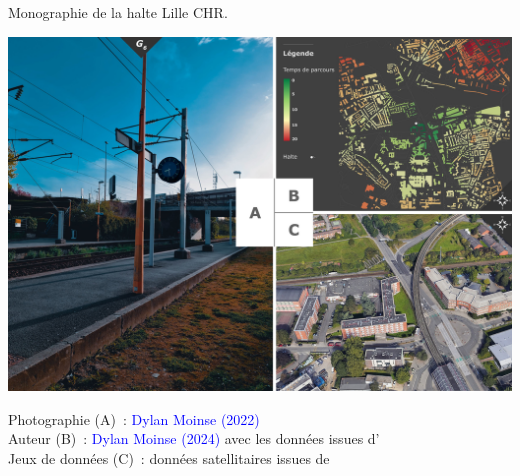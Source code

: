 \begin{refsegment}
        \begin{carte}[h!]\vspace*{4pt}
        \caption{Monographie de la halte Lille CHR.}
        \label{fig-chap3:monographie-lille-chr}
        \centerline{\includegraphics[height=.35\pageheight]{src/Figures/Chap-3/FR_Gare_Lille_CHR.jpg}}
        \vspace{5pt}
        \begin{flushright}\scriptsize{
        Photographie (A)~: \textcolor{blue}{Dylan Moinse (2022)}
        \\
        Auteur (B)~: \textcolor{blue}{Dylan Moinse (2024)} avec les données issues d'\textcolor{blue}{\textcite{openstreetmap_openstreetmap_2023}}
        \\
      Jeux de données (C)~: données satellitaires issues de \textcolor{blue}{\textcite{google_earth_google_2023}}
      }\end{flushright}
      \end{carte}


\end{refsegment}

